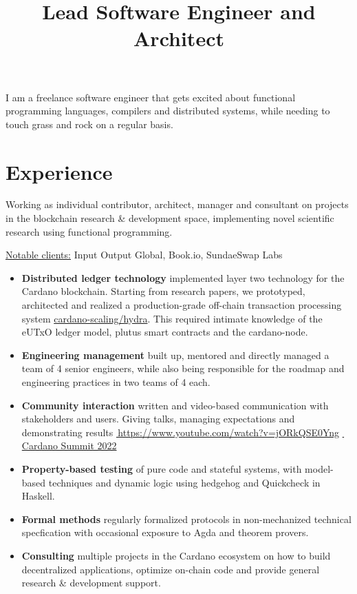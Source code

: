 \documentclass[11pt,a4paper,sans]{moderncv}
\title{Lead Software Engineer and Architect}
\renewcommand*{\link}[2][]{%
  \ifthenelse{\equal{#1}{}}%
    {\href{#2}{\color{link}\faExternalLink*\,#2}}%
    {\href{#2}{\color{link}\faExternalLink*\,#1}}}
\newcommand*{\githublink}[1]{\href{https://github.com/#1}{\color{link}\githubsocialsymbol#1}}%
\begin{document}
\makecvtitle

I am a freelance software engineer that gets excited about functional programming languages, compilers and distributed systems, while needing to touch grass and rock on a regular basis.

\section{Experience}

Working as individual contributor, architect, manager and consultant on projects
in the blockchain research \& development space, implementing novel scientific
research using functional programming.

\underline{Notable clients:} Input Output Global, Book.io, SundaeSwap Labs

\vspace{0.5em}
\begin{itemize}
\setlength\itemsep{0.5em}
  \item \textbf{Distributed ledger technology} implemented layer two technology for the Cardano blockchain. Starting from research papers, we prototyped, architected and realized a production-grade off-chain transaction processing system \githublink{cardano-scaling/hydra}. This required intimate knowledge of the eUTxO ledger model, plutus smart contracts and the cardano-node.
  \item \textbf{Engineering management} built up, mentored and directly managed a team of 4 senior engineers, while also being responsible for the roadmap and engineering practices in two teams of 4 each.
  \item \textbf{Community interaction} written and video-based communication with stakeholders and users. Giving talks, managing expectations and demonstrating results \link[Cardano Summit 2022]{https://www.youtube.com/watch?v=jORkQSE0Yng}
  \item \textbf{Property-based testing} of pure code and stateful systems, with model-based techniques and dynamic logic using hedgehog and Quickcheck in Haskell.
  \item \textbf{Formal methods} regularly formalized protocols in non-mechanized technical specfication with occasional exposure to Agda and theorem provers.
  \item \textbf{Consulting} multiple projects in the Cardano ecosystem on how to build decentralized applications, optimize on-chain code and provide general research \& development support.
\end{itemize}
\vspace{1em}
\end{document}
